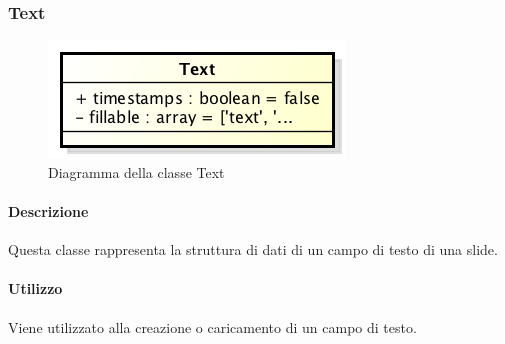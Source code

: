 \subsubsection{Text}

	\begin{figure}[h]
		\centering
		\includegraphics[width=0.5\linewidth]{img/back_end_premi_model_text}
		\caption[Diagramma della classe Text]{Diagramma della classe Text}
		\label{fig:back_end_premi_model_text}
	\end{figure}


	\paragraph{Descrizione}
	Questa classe rappresenta la struttura di dati di un campo di testo di una slide.
	
	\paragraph{Utilizzo}
	Viene utilizzato alla creazione o caricamento di un campo di testo.
	
